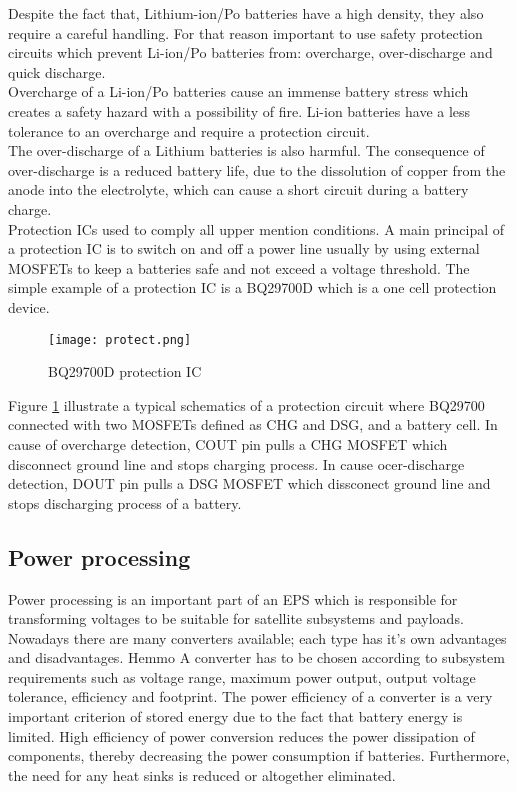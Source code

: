 Despite the fact that, Lithium-ion/Po batteries have a high density, they also require a careful handling. For that reason important to use safety protection circuits which prevent Li-ion/Po batteries from: overcharge, over-discharge and quick discharge.\\
\cite{16} Overcharge of a Li-ion/Po batteries cause an immense battery stress which creates a safety hazard with a possibility of fire. Li-ion batteries have a less tolerance to an overcharge and require a protection circuit.\\
The over-discharge of a Lithium batteries is also harmful. The consequence of over-discharge is a reduced battery life, due to the dissolution of copper from the anode into the electrolyte, which can cause a short circuit during a battery charge.\\
Protection ICs used to comply all upper mention conditions. A main principal of a protection IC is to switch on and off a power line usually by using external MOSFETs to keep a batteries safe and not exceed a voltage threshold. The simple example of a protection IC is a BQ29700D which is a one cell protection device. 

\begin{figure}[h]
	\centering
	\texttt{[image: protect.png]}
	\caption{ BQ29700D protection IC \cite{17}}
	\label{fig: EPS1}
\end{figure}

Figure \ref{fig: EPS1} illustrate a typical schematics of a protection circuit where BQ29700 connected with two MOSFETs defined as CHG and DSG, and a battery cell. In cause of overcharge detection, COUT pin pulls a CHG MOSFET which disconnect ground line and stops charging process. In cause ocer-discharge detection, DOUT pin pulls a DSG MOSFET which dissconect ground line and stops discharging process of a battery.

\subsection{Power processing \label{sec:tech}}

Power processing is an important part of an EPS which is responsible for transforming voltages to be suitable for satellite subsystems and payloads. Nowadays there are many converters available; each type has it's own advantages and disadvantages. Hemmo\cite{18} A converter has to be chosen according to subsystem requirements such as voltage range, maximum power output, output voltage tolerance, efficiency and footprint. The power efficiency of a converter is a very important criterion of stored energy due to the fact that battery energy is limited. High efficiency of  power conversion reduces the power dissipation of  components, thereby decreasing the power consumption if batteries. Furthermore, the need for any heat sinks is reduced or altogether eliminated. 

